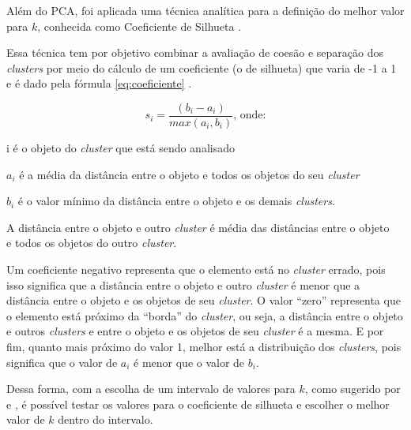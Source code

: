     Além do PCA, foi aplicada uma técnica analítica para a definição do melhor valor para $k$, conhecida como Coeficiente de Silhueta \cite{sklearn}.

    Essa técnica tem por objetivo combinar a avaliação de coesão e separação dos \textit{clusters} por meio do cálculo de um coeficiente (o de silhueta) que 
    varia de -1 a 1 e é dado pela fórmula \ref{eq:coeficiente} \cite{tan2013data}.

    \begin{equation} \label{eq:coeficiente}
      s_{i} = \frac{(b_{i} - a_{i})}{max(a_{i}, b_{i})} \mbox{, onde:}
    \end{equation}

    {\addtolength{\leftskip}{8mm}
	i é o objeto do \textit{cluster} que está sendo analisado
	
	$a_{i}$ é a média da distância entre o objeto e todos os objetos do seu \textit{cluster}
	
	$b_{i}$ é o valor mínimo da distância entre o objeto e os demais \textit{clusters}. 
	
	      \footnotesize \indent \indent A distância entre o objeto e outro \textit{cluster} é média das distâncias entre o objeto \\ \indent \indent e todos os objetos do outro \textit{cluster}.
    }

    Um coeficiente negativo representa que o elemento está no \textit{cluster} errado, pois isso significa que a distância entre o objeto e outro \textit{cluster} 
    é menor que a distância entre o objeto e os objetos de seu \textit{cluster}. O valor ``zero'' representa que o elemento está próximo da ``borda'' do \textit{cluster}, ou seja,
    a distância entre o objeto e outros \textit{clusters} e entre o objeto e os objetos de seu \textit{cluster} é a mesma. E por fim, quanto mais próximo do valor 1, melhor
    está a distribuição dos \textit{clusters}, pois significa que o valor de $a_i$ é menor que o valor de $b_i$.

    Dessa forma, com a escolha de um intervalo de valores para $k$, como sugerido por  e , é possível testar os valores 
    para o coeficiente de silhueta e escolher o melhor valor de $k$ dentro do intervalo. 

